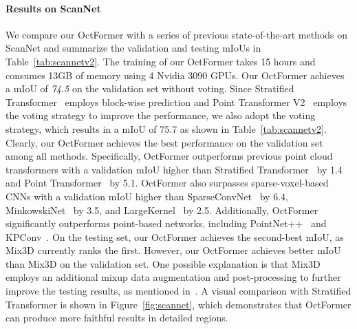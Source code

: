 \documentclass[acmtog,screen,authorversion]{acmart}
\begin{document}
\paragraph{Results on ScanNet}
We compare our OctFormer with a series of previous state-of-the-art methods on ScanNet and summarize the validation and testing mIoUs in Table~\ref{tab:scannetv2}.
The training of our OctFormer takes 15 hours and consumes 13GB of memory using 4 Nvidia 3090 GPUs.
Our OctFormer achieves a mIoU of \emph{74.5} on the validation set without voting.
Since Stratified Transformer~\cite{Lai2022}  employs block-wise prediction and Point Transformer V2~\cite{Wu2022} employs the voting strategy to improve the performance, we also adopt the voting strategy, which results in a mIoU of 75.7 as shown in Table~\ref{tab:scannetv2}.
Clearly, our OctFormer achieves the best performance on the validation set among all methods.
Specifically, OctFormer outperforms previous point cloud transformers with a validation mIoU higher than Stratified Transformer~\cite{Lai2022} by 1.4 and Point Transformer~\cite{Zhao2021} by 5.1.
OctFormer also surpasses sparse-voxel-based CNNs with a validation mIoU higher than SparseConvNet~\cite{Graham2018} by 6.4, MinkowskiNet~\cite{Choy2019} by 3.5, and LargeKernel~\cite{Chen2022} by 2.5.
Additionally, OctFormer significantly outperforms point-based networks, including PointNet++~\cite{Qi2017} and KPConv~\cite{Thomas2019}.
On the testing set, our OctFormer achieves the second-best mIoU, as Mix3D currently ranks the first.
However, our OctFormer achieves better mIoU than Mix3D on the validation set.
One possible explanation is that Mix3D employs an additional mixup data augmentation and post-processing to further improve the testing results, as mentioned in~\cite{Nekrasov2021}.
A visual comparison with Stratified Transformer is shown in Figure~\ref{fig:scannet}, which demonstrates that OctFormer can produce more faithful results in detailed regions.
\end{document}
